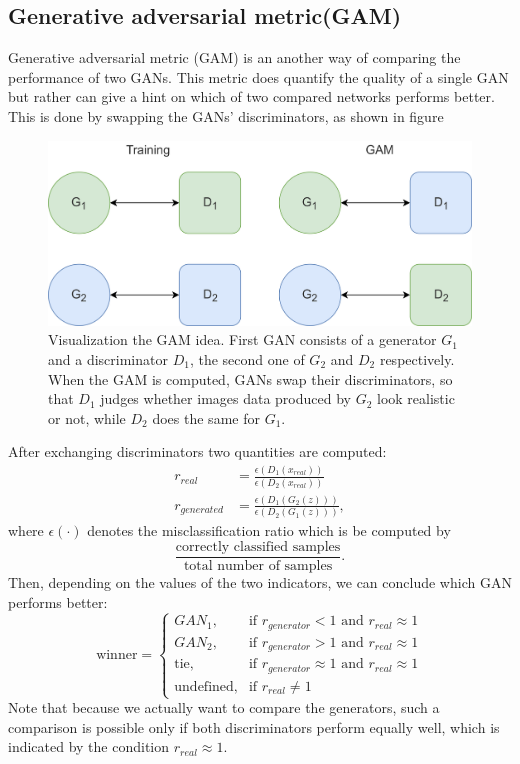 \subsection{Generative adversarial metric(GAM)} \label{sec:gam}
Generative adversarial metric (GAM) is an another way of comparing the performance of two GANs. This metric does quantify the quality of a single GAN but rather can give a hint on which of two compared networks performs better. This is done by swapping the GANs' discriminators, as shown in figure 
\begin{figure}[h]
	\includegraphics[width=\textwidth]{figures/gam}
	\caption{Visualization the GAM idea. First GAN consists of a generator $G_1$ and a discriminator $D_1$, the second one of $G_2$ and $D_2$ respectively. When the GAM is computed, GANs swap their discriminators, so that $D_1$ judges whether images data produced by $G_2$ look realistic or not, while $D_2$ does the same for $G_1$.}
	\label{fig:gam}
\end{figure}
 
After exchanging discriminators two quantities are computed:
\begin{align} \label{eq:gam_real}
	r_{real} &= \frac{\epsilon(D_1(x_{real}))}{\epsilon(D_2(x_{real}))} \\ 
	r_{generated} &= \frac{\epsilon(D_1(G_2(z)))}{\epsilon(D_2(G_1(z)))}, \label{eq:gam_gen} 
 \end{align}
where $\epsilon(\cdot)$ denotes the misclassification ratio which is be computed by 
\begin{equation*}
	\frac{\text{correctly classified samples}}{\text{total number of samples}}.
\end{equation*} 
Then, depending on the values of the two indicators, we can conclude which GAN performs better:
\begin{equation}
\text{winner} = \begin{cases}
	GAN_1, & \text{if } r_{generator} < 1 \text{ and } r_{real} \approx 1 \\
	GAN_2, & \text{if } r_{generator} > 1 \text{ and } r_{real} \approx 1 \\
	\text{tie}, & \text{if } r_{generator} \approx 1 \text{ and } r_{real} \approx 1  \\
	\text{undefined}, & \text{if } r_{real} \neq 1	
	\end{cases}
\end{equation}
Note that because we actually want to compare the generators, such a comparison is possible only if both discriminators perform equally well, which is indicated by the condition $r_{real} \approx 1$.  
